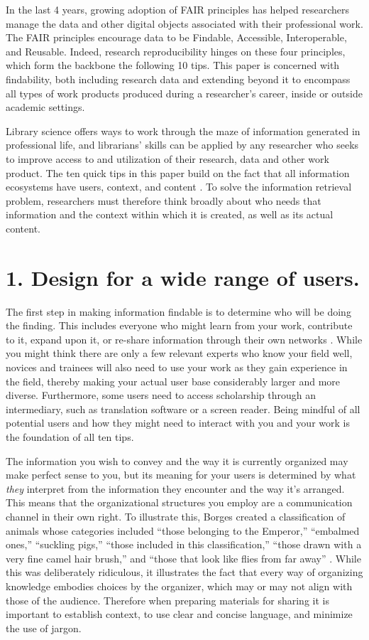 \documentclass[10pt,letterpaper]{article}
\newcommand{\rulemajor}[1]{\section*{#1}}
\begin{document}
In the last 4 years, growing adoption of FAIR principles \cite{Wilkinson2016}
has helped researchers manage the data and other digital objects associated with
their professional work. The FAIR principles encourage data to be Findable,
Accessible, Interoperable, and Reusable. Indeed, research reproducibility
hinges on these four principles, which form the backbone the following 10 tips.
This paper is concerned with findability, both including research data and
extending beyond it to encompass all types of work products produced during a
researcher's career, inside or outside academic settings.

Library science offers ways to work through the maze of information generated in
professional life, and librarians' skills can be applied by any researcher who
seeks to improve access to and utilization of their research, data and other
work product. The ten quick tips in this paper build on the fact that all
information ecosystems have users, context, and content \cite{Rosenfeld2015}.
To solve the information retrieval problem, researchers must therefore think
broadly about who needs that information and the context within which it is
created, as well as its actual content.

\rulemajor{1. Design for a wide range of users.}

The first step in making information findable is to determine who will be doing
the finding. This includes everyone who might learn from your work, contribute
to it, expand upon it, or re-share information through their own networks
\cite{Covert2014}. While you might think there are only a few relevant experts
who know your field well, novices and trainees will also need to use your work
as they gain experience in the field, thereby making your actual user base
considerably larger and more diverse. Furthermore, some users need to access
scholarship through an intermediary, such as translation software or a screen
reader. Being mindful of all potential users and how they might need to
interact with you and your work is the foundation of all ten tips.

The information you wish to convey and the way it is currently organized may
make perfect sense to you, but its meaning for your users is determined by what
\emph{they} interpret from the information they encounter and the way it's
arranged. This means that the organizational structures you employ are a
communication channel in their own right. To illustrate this, Borges created a
classification of animals whose categories included ``those belonging to the
Emperor,'' ``embalmed ones,'' ``suckling pigs,'' ``those included in this
classification,'' ``those drawn with a very fine camel hair brush,'' and ``those
that look like flies from far away'' \cite{Borges2000}. While this was
deliberately ridiculous, it illustrates the fact that every way of organizing
knowledge embodies choices by the organizer, which may or may not align with
those of the audience. Therefore when preparing materials for sharing it is
important to establish context, to use clear and concise language, and minimize
the use of jargon.
\end{document}
